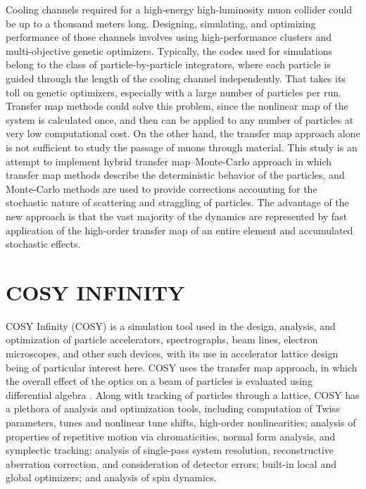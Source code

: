 \documentclass[a4paper,11pt]{article}
\begin{document}
Cooling channels required for a high-energy high-luminosity muon collider could be up to a thousand meters long. Designing, simulating, and optimizing performance of those channels involves using high-performance clusters and multi-objective genetic optimizers. Typically, the codes used for simulations belong to the class of particle-by-particle integrators, where each particle is guided through the length of the cooling channel independently. That takes its toll on genetic optimizers, especially with a large number of particles per run. Transfer map methods could solve this problem, since the nonlinear map of the system is calculated once, and then can be applied to any number of particles at very low computational cost. On the other hand, the transfer map approach alone is not sufficient to study the passage of muons through material. This study is an attempt to implement hybrid transfer map--Monte-Carlo approach in which transfer map methods describe the deterministic behavior of the particles, and Monte-Carlo methods are used to provide corrections accounting for the stochastic nature of scattering and straggling of particles. The advantage of the new approach is that the vast majority of the dynamics are represented by fast application of the high-order transfer map of an entire element and accumulated stochastic effects.

\section{COSY INFINITY}

COSY Infinity (COSY) \cite{COSY} is a simulation tool used in the design, analysis, and optimization of particle accelerators, spectrographs, beam lines, electron microscopes, and other such devices, with its use in accelerator lattice design being of particular interest here. COSY uses the transfer map approach, in which the overall effect of the optics on a beam of particles is evaluated using differential algebra \cite{berzMMM}. Along with tracking of particles through a lattice, COSY has a plethora of analysis and optimization tools, including computation of Twiss parameters, tunes and nonlinear tune shifts, high-order nonlinearities; analysis of properties of repetitive motion via chromaticities, normal form analysis, and symplectic tracking; analysis of single-pass system resolution, reconstructive aberration correction, and consideration of detector errors; built-in local and global optimizers; and analysis of spin dynamics.
\end{document}
